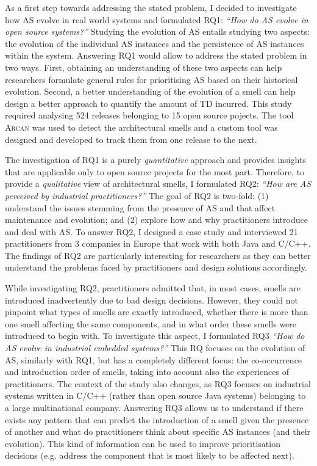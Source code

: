 As a first step towards addressing the stated problem, I decided to investigate how AS evolve in real world systems and formulated RQ1: \textit{``How do AS evolve in open source systems?''} 
Studying the evolution of AS entails studying two aspects: the evolution of the individual AS instances and the persistence of AS instances within the system.
Answering RQ1 would allow to address the stated problem in two ways. First, obtaining an understanding of these two aspects can help researchers formulate general rules for prioritising AS based on their historical evolution.
Second, a better understanding of the evolution of a smell can help design a better approach to quantify the amount of TD incurred.
This study required analysing 524 releases belonging to 15 open source pojects.
The tool \textsc{Arcan} was used to detect the architectural smells and a custom tool was designed and developed to track them from one release to the next.

The investigation of RQ1 is a purely \emph{quantitative} approach and provides insights that are applicable only to open source projects for the most part.
Therefore, to provide a \emph{qualitative} view of architectural smells, I formulated RQ2: \textit{``How are AS perceived by industrial practitioners?''}
The goal of RQ2 is two-fold: (1) understand the issues stemming from the presence of AS and that affect maintenance and evolution; and (2) explore how and why practitioners introduce and deal with AS.
To answer RQ2, I designed a case study and interviewed 21 practitioners from 3 companies in Europe that work with both Java and C/C++.
The findings of RQ2 are particularly interesting for researchers as they can better understand the problems faced by practitioners and design solutions accordingly.

While investigating RQ2, practitioners admitted that, in most cases, smells are introduced inadvertently due to bad design decisions.
However, they could not pinpoint what types of smells are exactly introduced, whether there is more than one smell affecting the same components, and in what order these smells were introduced to begin with.
To investigate this aspect, I formulated RQ3 \textit{``How do AS evolve in industrial embedded systems?''}
This RQ focuses on the evolution of AS, similarly with RQ1, but has a completely different focus: the co-occurrence and introduction order of smells, taking into account also the experiences of practitioners.
The context of the study also changes, as RQ3 focuses on industrial systems written in C/C++ (rather than open source Java systems) belonging to a large multinational company.
Answering RQ3 allows us to understand if there exists any pattern that can predict the introduction of a smell given the presence of another and what do practitioners think about specific AS instances (and their evolution).
This kind of information can be used to improve prioritisation decisions (e.g. address the component that is most likely to be affected next).

